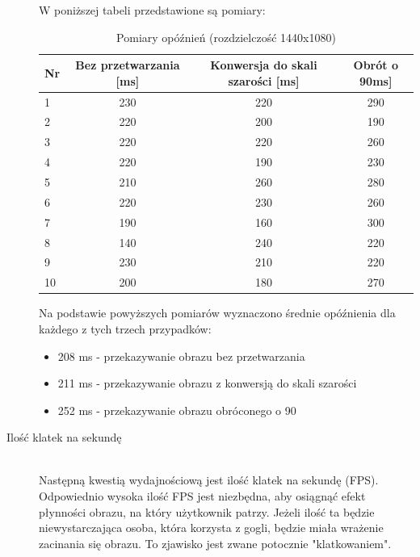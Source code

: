 \documentclass[a4paper,11pt,twoside]{report}
\theoremstyle{definition}
\begin{document}
\begin{description}
W poniższej tabeli przedstawione są pomiary:
\begin{table}[H]
\centering
\begin{tabular}{lccc}
Nr & Bez przetwarzania {[}ms{]} & Konwersja do skali szarości {[}ms{]} & Obrót o 90\textdegree {[}ms{]} \\ \hline
1  & 230                        & 220                                  & 290                            \\
2  & 220                        & 200                                  & 190                            \\
3  & 220                        & 220                                  & 260                            \\
4  & 220                        & 190                                  & 230                            \\
5  & 210                        & 260                                  & 280                            \\
6  & 220                        & 230                                  & 260                            \\
7  & 190                        & 160                                  & 300                            \\
8  & 140                        & 240                                  & 220                            \\
9  & 230                        & 210                                  & 220                            \\
10 & 200                        & 180                                  & 270                            
\end{tabular}
\caption{Pomiary opóźnień (rozdzielczość 1440x1080)}
\end{table}

Na podstawie powyższych pomiarów wyznaczono średnie opóźnienia dla każdego z tych trzech przypadków:

\begin{itemize}
\item 208 ms - przekazywanie obrazu bez przetwarzania 
\item 211 ms - przekazywanie obrazu z konwersją do skali szarości
\item 252 ms - przekazywanie obrazu obróconego o 90\textdegree
\end{itemize}


\item[Ilość klatek na sekundę] \hfill \\
Następną kwestią wydajnościową jest ilość klatek na sekundę (FPS). Odpowiednio wysoka ilość FPS jest niezbędna, aby osiągnąć efekt płynności obrazu, na który użytkownik patrzy. Jeżeli ilość ta będzie niewystarczająca osoba, która korzysta z gogli, będzie miała wrażenie zacinania się obrazu. To zjawisko jest zwane potocznie "klatkowaniem".


\end{description}
\end{document}
